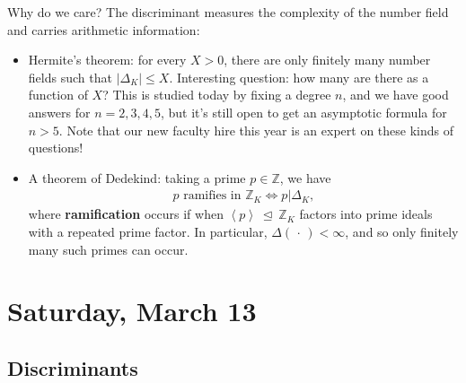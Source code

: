\begin{remark}

Why do we care? The discriminant measures the complexity of the number
field and carries arithmetic information:

\begin{itemize}
\item
  Hermite's theorem: for every \(X>0\), there are only finitely many
  number fields such that
  \({\left\lvert { {\Delta}_K } \right\rvert} \leq X\). Interesting
  question: how many are there as a function of \(X\)? This is studied
  today by fixing a degree \(n\), and we have good answers for
  \(n=2,3,4,5\), but it's still open to get an asymptotic formula for
  \(n>5\). Note that our new faculty hire this year is an expert on
  these kinds of questions!
\item
  A theorem of Dedekind: taking a prime \(p\in {\mathbb{Z}}\), we have
  \begin{align*}
  p \text{ ramifies in } {\mathbb{Z}}_K \iff p \mathrel{\Big|}{\Delta}_K
  ,\end{align*}
  where \textbf{ramification} occurs if when
  \(\left\langle{ p }\right\rangle{~\trianglelefteq~}{\mathbb{Z}}_K\)
  factors into prime ideals with a repeated prime factor. In particular,
  \({\Delta}({\,\cdot\,}) < \infty\), and so only finitely many such
  primes can occur.
\end{itemize}

\end{remark}

\hypertarget{saturday-march-13}{%
\section{Saturday, March 13}\label{saturday-march-13}}

\hypertarget{discriminants-1}{%
\subsection{Discriminants}\label{discriminants-1}}


